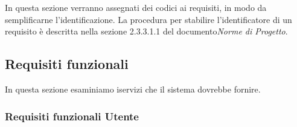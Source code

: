 \documentclass[../analisi-dei-requisiti]{subfiles}
\begin{document}
In questa sezione verranno assegnati dei codici ai requisiti, in modo da semplificarne l’identificazione. La procedura per stabilire l'identificatore di un requisito è descritta nella sezione 2.3.3.1.1 del documento\textit{Norme di Progetto}.

\subsection{Requisiti funzionali}%
\label{sub:requisiti_funzionali}
In questa sezione esaminiamo iservizi che il sistema dovrebbe fornire.

\subsubsection{Requisiti funzionali Utente}%
\label{subsub:requisiti_funzionali_utente}
\end{document}
